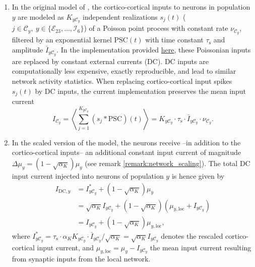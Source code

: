 \documentclass[10pt,a4paper,twoside,american]{article}
\theoremstyle{definitionstyle}
\newcommand{\tauS}{\tau_\text{s}}
\begin{document}
\begin{appendices}
\begin{enumerate}
\item \label{remark:cortico_cortical_dc}
  In the original model of \citet{Potjans14}, the cortico-cortical inputs to neurons in population $y$ are modeled as $K_{y\mathcal{C}_{y}}$ independent realizations $s_j(t)$ ($j\in\mathcal{C}_y,\ y\in \{\mathcal{E}_{23},\ldots,\mathcal{I}_{6}\}$) of a Poisson point process with constant rate $\nu_{\mathcal{C}_y}$, filtered by an exponential kernel $\text{PSC}(t)$ with time constant $\tauS$ and amplitude $\bar{I}_{y\mathcal{C}_y}$.   
  In the implementation provided \href{https://github.com/INM-6/microcircuit-PD14-model}{here}, these Poissonian inputs are replaced by constant external currents (DC).
  DC inputs are computationally less expensive, exactly reproducible, and lead to similar network activity statistics.
  When replacing cortico-cortical input spikes $s_j(t)$ by DC inputs, the current implementation preserves the mean input current
  \begin{equation}
    I_{\mathcal{C}_y}
    = \left\langle \sum_{j=1}^{K_{y\mathcal{C}_y}} \left(s_j*\text{PSC}\right)(t) \right\rangle
    = K_{y\mathcal{C}_y} \cdot \tauS \cdot \bar{I}_{y\mathcal{C}_y} \cdot \nu_{\mathcal{C}_y} .
  \end{equation}
\item \label{remark:dc_scaling_constraints}
  In the scaled version of the model, the neurons receive --in addition to the cortico-cortical inputs-- an additional constant input current of magnitude $\Delta\mu_y = ( 1 - \sqrt{\alpha_K}) \mu_y$ (see remark \ref{remark:network_scaling}).
  The total DC input current injected into neurons of population $y$ is hence given by
  \begin{equation}
    \label{eq:dc_magnitude_rescaled}
    \begin{aligned}
    I_{\text{DC},y}
    & = I_{y\mathcal{C}_y}^* + \left( 1 - \sqrt{\alpha_K} \right) \mu_y\\
    & = \sqrt{\alpha_K} I_{y\mathcal{C}_y} + \left( 1 - \sqrt{\alpha_K} \right) \left( \mu_{y,\text{loc}} + I_{y\mathcal{C}_y}\right) \\
    & = I_{y\mathcal{C}_y} + \left( 1 - \sqrt{\alpha_K} \right) \mu_{y,\text{loc}}
    ,      
    \end{aligned}
  \end{equation}
  where $I_{y\mathcal{C}_y}^* = \tauS \cdot \alpha_K K_{y\mathcal{C}_y} \cdot \bar{I}_{y\mathcal{C}_y}/\sqrt{\alpha_K} = \sqrt{\alpha_K} I_{y\mathcal{C}_y}$ denotes the rescaled cortico-cortical input current, and  $\mu_{y,\text{loc}}=\mu_y - I_{y\mathcal{C}_y}$ the mean input current resulting from synaptic inputs from the local network.

\end{enumerate}
\end{appendices}
\end{document}
